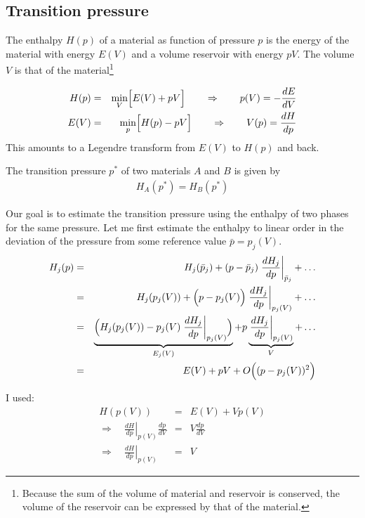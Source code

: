 \documentclass[final,12pt,makeidx,DIV=calc]{article}
\begin{document}
{{{{{{%

\subsection{Transition pressure}
\label{sec:transitionpressure}
The enthalpy $H(p)$ of a material as function of pressure $p$ is the
energy of the material with energy $E(V)$ and a volume reservoir with
energy $pV$. The volume $V$ is that of the material\footnote{Because
the sum of the volume of material and reservoir is conserved, the
volume of the reservoir can be expressed by that of the material.}

\begin{eqnarray}
H(p)&=&\min_{V}\Bigl[ E(V)+pV \Bigr]
\qquad\Rightarrow\qquad
p(V)=-\frac{dE}{dV}
\nonumber\\
E(V)&=&\min_p\Bigl[H(p)-pV\Bigr]
\qquad\Rightarrow\qquad
V(p)=\frac{dH}{dp}
\end{eqnarray}
This amounts to a Legendre transform from $E(V)$ to $H(p)$ and back.

The transition pressure $p^*$ of two materials $A$ and $B$ is given by
\begin{eqnarray}
H_A(p^*)=H_B(p^*)
\end{eqnarray}

Our goal is to estimate the transition pressure using the enthalpy of
two phases for the same pressure. Let me first estimate the enthalpy
to linear order in the deviation of the pressure from some reference value
$\bar{p}=p_j(V)$.
\begin{eqnarray}
H_j(p)&=&H_j(\bar{p}_j)+(p-\bar{p}_j)\left.\frac{dH_j}{dp}\right|_{\bar{p}_j}
+\ldots
\nonumber\\
&=&H_j(p_j(V))+\Big(p-p_j(V)\Big)\left.\frac{dH_j}{dp}\right|_{p_j(V)}
+\ldots
\nonumber\\
%
&=&
\underbrace{
\Bigl(H_j(p_j(V))
-p_j(V)\left.\frac{dH_j}{dp}\right|_{p_j(V)}\Bigr)}_{E_j(V)}
+p\underbrace{\left.\frac{dH_j}{dp}\right|_{p_j(V)}}_{V}
+\ldots
\nonumber\\
&=&E(V)+pV+O\Bigl((p-p_j(V))^2\Bigr)
\end{eqnarray}

I used:
\begin{eqnarray}
H(p(V))&=&E(V)+V p(V)
\nonumber\\
\Rightarrow\quad
\left.\frac{dH}{dp}\right|_{p(V)}\frac{dp}{dV}
&=&V\frac{dp}{dV}
\nonumber\\
\Rightarrow\quad
\left.\frac{dH}{dp}\right|_{p(V)}
&=&V
\end{eqnarray}

}}}}}}
\end{document}
